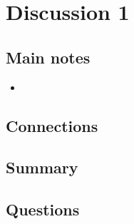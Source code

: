 \section{Discussion 1}

\subsection{Main notes}


\begin{itemize}
	\item
\end{itemize}


\subsection{Connections}


\subsection{Summary}


\subsection{Questions}
